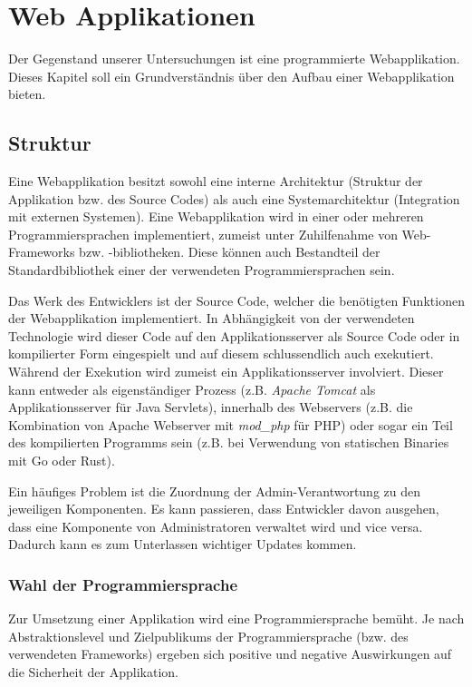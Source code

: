 \chapter{Web Applikationen}

Der Gegenstand unserer Untersuchungen ist eine programmierte Webapplikation. Dieses Kapitel soll ein Grundverständnis über den Aufbau einer Webapplikation bieten.

\section{Struktur}

Eine Webapplikation besitzt sowohl eine interne Architektur (Struktur der Applikation bzw. des Source Codes) als auch eine Systemarchitektur (Integration mit externen Systemen). Eine Webapplikation wird in einer oder mehreren Programmiersprachen implementiert, zumeist unter Zuhilfenahme von Web-Frameworks bzw. -bibliotheken. Diese können auch Bestandteil der Standardbibliothek einer der verwendeten Programmiersprachen sein.

Das Werk des Entwicklers ist der Source Code, welcher die benötigten Funktionen der Webapplikation implementiert. In Abhängigkeit von der verwendeten Technologie wird dieser Code auf den Applikationsserver als Source Code oder in kompilierter Form eingespielt und auf diesem schlussendlich auch exekutiert. Während der Exekution wird zumeist ein Applikationsserver involviert. Dieser kann entweder als eigenständiger Prozess (z.B. \textit{Apache Tomcat} als Applikationsserver für Java Servlets), innerhalb des Webservers (z.B. die Kombination von Apache Webserver mit \textit{mod\_php} für PHP) oder sogar ein Teil des kompilierten Programms sein (z.B. bei Verwendung von statischen Binaries mit Go oder Rust).

Ein häufiges Problem ist die Zuordnung der Admin-Verantwortung zu den jeweiligen Komponenten. Es kann passieren, dass Entwickler davon ausgehen, dass eine Komponente von Administratoren verwaltet wird und vice versa. Dadurch kann es zum Unterlassen wichtiger Updates kommen.

\subsection{Wahl der Programmiersprache}

Zur Umsetzung einer Applikation wird eine Programmiersprache bemüht. Je nach Abstraktionslevel und Zielpublikums der Programmiersprache (bzw. des verwendeten Frameworks) ergeben sich positive und negative Auswirkungen auf die Sicherheit der Applikation.

